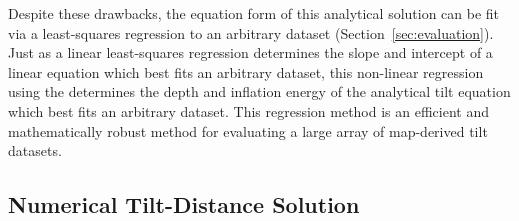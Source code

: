 Despite these drawbacks, the equation form of this analytical solution can be fit via a least-squares regression to an arbitrary dataset (Section~\ref{sec:evaluation}). Just as a linear least-squares regression determines the slope and intercept of a linear equation which best fits an arbitrary dataset, this non-linear regression using the determines the depth and inflation energy of the analytical tilt equation which best fits an arbitrary dataset. This regression method is an efficient and mathematically robust method for evaluating a large array of map-derived tilt datasets.





\subsection{Numerical Tilt-Distance Solution}\label{sec:numerical-tilt-solution}

